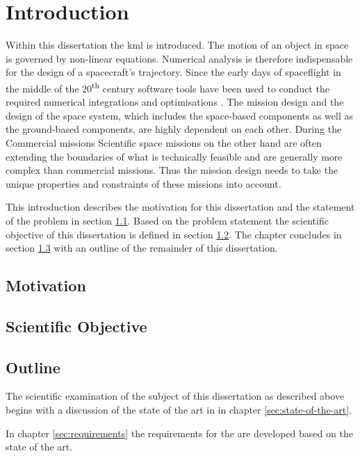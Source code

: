 \chapter{Introduction}
\label{sec:introduction}
Within this dissertation the \ac{kml} is introduced.
The motion of an object in space is governed by non-linear equations.
Numerical analysis is therefore indispensable for the design of a spacecraft's trajectory.
Since the early days of spaceflight in the middle of the 20\textsuperscript{th} century software tools have been used to conduct the required numerical integrations and optimisations .
The mission design and the design of the space system, which includes the space-based components as well as the ground-based components, are highly dependent on each other.
During the 
Commercial missions
Scientific space missions on the other hand are often extending the boundaries of what is technically feasible and are generally more complex than commercial missions.
Thus the mission design needs to take the unique properties and constraints of these missions into account.



This introduction describes the motivation for this dissertation and the statement of the problem in section \ref{sec:motivation}.
Based on the problem statement the scientific objective of this dissertation is defined in section \ref{sec:scientific-objective}.
The chapter concludes in section \ref{sec:outline} with an outline of the remainder of this dissertation.

\section{Motivation}
\label{sec:motivation}

\section{Scientific Objective}
\label{sec:scientific-objective}

\section{Outline}
\label{sec:outline}
The scientific examination of the subject of this dissertation as described above begins with a discussion of the state of the art in  in chapter \ref{sec:state-of-the-art}.

In chapter \ref{sec:requirements} the requirements for the \topic are developed based on the state of the art.


